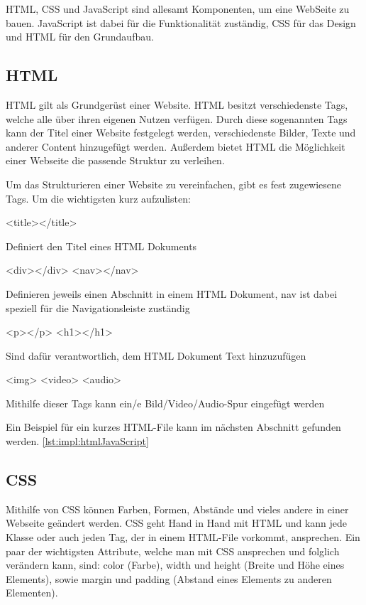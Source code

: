 HTML, CSS und JavaScript sind allesamt Komponenten, um eine WebSeite zu bauen. JavaScript ist dabei für die Funktionalität zuständig, CSS für das Design und HTML für den Grundaufbau.

\subsection{HTML}
HTML gilt als Grundgerüst einer Website. HTML besitzt verschiedenste Tags, welche alle über ihren eigenen Nutzen verfügen. Durch diese sogenannten Tags kann der Titel einer Website festgelegt werden, verschiedenste Bilder, Texte und anderer Content hinzugefügt werden. Außerdem bietet HTML die Möglichkeit einer Webseite die passende Struktur zu verleihen.
 
Um das Strukturieren einer Website zu vereinfachen, gibt es fest zugewiesene Tags. Um die wichtigsten kurz aufzulisten:
 
\begin{compactitem}
    \item [<title></title>]
    \item Definiert den Titel eines HTML Dokuments
    \item [<div></div> <nav></nav>]
    \item Definieren jeweils einen Abschnitt in einem HTML Dokument, nav ist dabei speziell für die Navigationsleiste zuständig
    \item [<p></p> <h1></h1>]
    \item Sind dafür verantwortlich, dem HTML Dokument Text hinzuzufügen
    \item [<img> <video> <audio>]
    \item Mithilfe dieser Tags kann ein/e Bild/Video/Audio-Spur eingefügt werden
\end{compactitem}
 
Ein Beispiel für ein kurzes HTML-File kann im nächsten Abschnitt gefunden werden. \ref{lst:impl:htmlJavaScript}
 
\subsection{CSS}
Mithilfe von CSS können Farben, Formen, Abstände und vieles andere in einer Webseite geändert werden. CSS geht Hand in Hand mit HTML und kann jede Klasse oder auch jeden Tag, der in einem HTML-File vorkommt, ansprechen. Ein paar der wichtigsten Attribute, welche man mit CSS ansprechen und folglich verändern kann, sind: color (Farbe), width und height (Breite und Höhe eines Elements), sowie margin und padding (Abstand eines Elements zu anderen Elementen).
 
